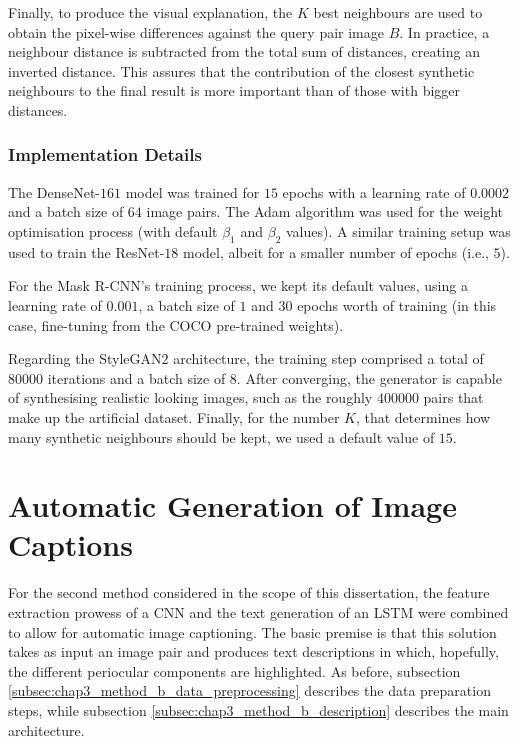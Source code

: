 Finally, to produce the visual explanation, the $K$ best neighbours are used to obtain the pixel-wise differences against the query pair image $B$. In practice, a neighbour distance is subtracted from the total sum of distances, creating an inverted distance. This assures that the contribution of the closest synthetic neighbours to the final result is more important than of those with bigger distances. 

\subsubsection{Implementation Details}
\label{subsec:chap3_method_a_implementation_details}

The DenseNet-$161$ model was trained for $15$ epochs with a learning rate of $0.0002$ and a batch size of $64$ image pairs. The Adam algorithm was used for the weight optimisation process (with default $\beta_1$ and $\beta_2$ values). A similar training setup was used to train the ResNet-$18$ model, albeit for a smaller number of epochs (i.e., $5$).

For the Mask \ac{R-CNN}'s training process, we kept its default values, using a learning rate of $0.001$, a batch size of $1$ and $30$ epochs worth of training (in this case, fine-tuning from the COCO pre-trained weights).

Regarding the Style\ac{GAN}$2$ architecture, the training step comprised a total of $80 000$ iterations and a batch size of $8$. After converging, the generator is capable of synthesising realistic looking images, such as the roughly $400 000$ pairs that make up the artificial dataset. Finally, for the number $K$, that determines how many synthetic neighbours should be kept, we used a default value of $15$.

\section{Automatic Generation of Image Captions}
\label{sec:chap3_method_b}

For the second method considered in the scope of this dissertation, the feature extraction prowess of a  \ac{CNN} and the text generation of an \ac{LSTM} were combined to allow for automatic image captioning. The basic premise is that this solution takes as input an image pair and produces text descriptions in which, hopefully, the different periocular components are highlighted. As before, subsection \ref{subsec:chap3_method_b_data_preprocessing} describes the data preparation steps, while subsection \ref{subsec:chap3_method_b_description} describes the main architecture.

